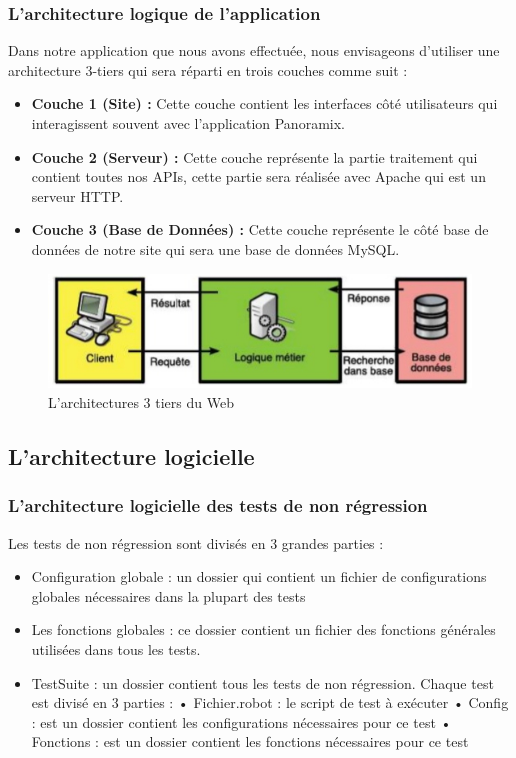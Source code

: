 \subsubsection{L'architecture logique de l’application}
Dans notre application que nous avons effectuée, nous envisageons d’utiliser une architecture 3-tiers qui sera réparti en trois couches comme suit :
\begin{itemize}
	\item\textbf{ Couche 1 (Site) :} Cette couche contient les interfaces côté utilisateurs qui interagissent souvent avec l’application Panoramix.
	\item\textbf{ Couche 2 (Serveur) : }Cette couche représente la partie traitement qui contient toutes nos APIs, cette partie sera réalisée avec Apache qui est un serveur HTTP.
	\item \textbf{Couche 3 (Base de Données) :} Cette couche représente le côté base de données de notre site qui sera une base de données MySQL.
\end{itemize}
\begin{figure}[H]
	\centering
	\includegraphics[width=0.7\linewidth]{img/architectures-3tiers-web}
	\caption[L'architectures 3 tiers du Web]{L'architectures 3 tiers du Web}
	\label{fig:architectures-3tiers-web}
\end{figure}

\subsection[L'architecture logicielle]{L'architecture logicielle}
\subsubsection{L'architecture logicielle des tests de non régression}
Les tests de non régression sont divisés en 3 grandes parties :
\begin{itemize}
	\item Configuration globale : un dossier qui contient un fichier de configurations globales nécessaires dans la plupart des tests
	\item Les fonctions globales : ce dossier contient un fichier des fonctions générales utilisées dans tous les tests.
	\item TestSuite :  un dossier contient tous les tests de non régression. Chaque test est divisé en 3 parties :
		\subitem • Fichier.robot : le script de test à exécuter
		\subitem • Config : est un dossier contient les configurations nécessaires pour ce test
		\subitem • Fonctions : est un dossier contient les fonctions nécessaires pour ce test
\end{itemize}

